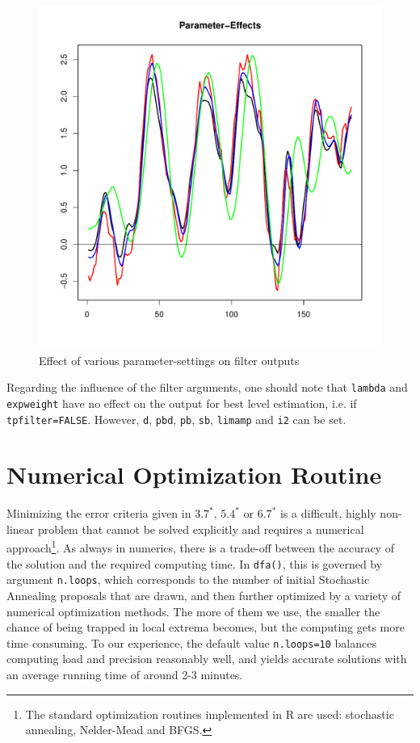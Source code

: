 \documentclass[a4paper]{article}
\begin{document}
\begin{figure}[htb!] 
\begin{center}
\includegraphics[width=\textwidth]{parametersetting}
\caption{Effect of various parameter-settings on filter
  outputs\label{fig4}}
\end{center}
\end{figure}

Regarding the influence of the filter arguments, one should note that
\texttt{lambda} and \texttt{expweight} have no effect on the output
for best level estimation, i.e. if \texttt{tpfilter=FALSE}. However,
\texttt{d}, \texttt{pbd}, \texttt{pb}, \texttt{sb}, \texttt{limamp}
and \texttt{i2} can be set. 







\section{Numerical Optimization Routine}

Minimizing the error criteria given in $3.7^*$, $5.4^*$ or $6.7^*$ is
a difficult, highly non-linear problem that cannot be solved
explicitly and requires a numerical approach\footnote{The standard
  optimization routines implemented in R are used: stochastic
  annealing, Nelder-Mead and BFGS.}. As always in numerics, there is a
trade-off between the accuracy of the solution and the required
computing time.  In \texttt{dfa()}, this is governed by argument
\texttt{n.loops}, which corresponds to the number of initial
Stochastic Annealing proposals that are drawn, and then further
optimized by a variety of numerical optimization methods. The more of
them we use, the smaller the chance of being trapped in local extrema
becomes, but the computing gets more time consuming.  To our
experience, the default value \texttt{n.loops=10} balances computing
load and precision reasonably well, and yields accurate solutions with
an average running time of around 2-3 minutes. \\
\end{document}
